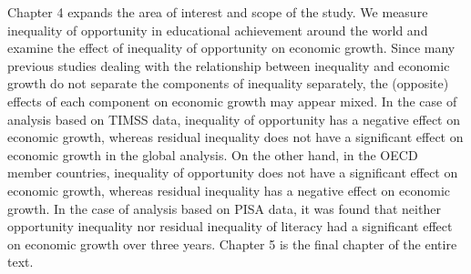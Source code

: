 \documentclass[oneside,ko,phd]{snuthesis}
\begin{document}
\begin{abstractalt}
Chapter 4 expands the area of interest and scope of the study. We measure inequality of opportunity in educational achievement around the world and examine the effect of inequality of opportunity on economic growth. Since many previous studies dealing with the relationship between inequality and economic growth do not separate the components of inequality separately, the (opposite) effects of each component on economic growth may appear mixed. In the case of analysis based on TIMSS data, inequality of opportunity has a negative effect on economic growth, whereas residual inequality does not have a significant effect on economic growth in the global analysis. On the other hand, in the OECD member countries, inequality of opportunity does not have a significant effect on economic growth, whereas residual inequality has a negative effect on economic growth. In the case of analysis based on PISA data, it was found that neither opportunity inequality nor residual inequality of literacy had a significant effect on economic growth over three years. Chapter 5 is the final chapter of the entire text.
\end{abstractalt}

\end{document}
